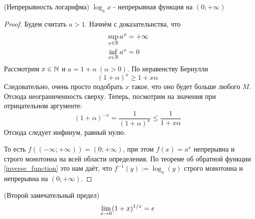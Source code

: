 \begin{corollary} (Непрерывность логарифма)
	$\log_a x$ - непрерывная функция на $(0; +\infty)$
\end{corollary}

\begin{proof}
	Будем считать $a > 1$. Начнём с доказательнства, что
	\begin{align*}
		&\sup\limits_{x \in \mathbb{R}} a^x = +\infty
		\\
		&\inf\limits_{x \in \mathbb{R}} a^x = 0
	\end{align*}
	Рассмотрим $x \in \mathbb{N}$ и $a = 1 + \alpha\ (\alpha > 0)$. По неравенству Бернулли
	\[
		(1 + \alpha)^x \ge 1 + x\alpha
	\]
	Следовательно, очень просто подобрать $x$ такое, что оно будет больше любого $M$. Отсюда неограниченность сверху. Теперь, посмотрим на значения при отрицательном аргументе:
	\[
		(1 + \alpha)^{-x} = \frac{1}{(1 + \alpha)^x} \le \frac{1}{1 + x\alpha}
	\]
	Отсюда следует инфинум, равный нулю.
	
	То есть $f((-\infty; +\infty)) = (0; +\infty)$, при этом $f(x) = a^x$ непрерывна и строго монотонна на всей области определения. По теореме об обратной функции \ref{inverse_function} это нам даёт, что $f^{-1}(y) := \log_a (y)$ строго монотонна и непрерывна на $(0; +\infty)$.
\end{proof}

\begin{theorem} (Второй замечательный предел) \\
	\[
		\lim\limits_{x \to 0} (1 + x)^{1 / x} = e
	\]
\end{theorem}


